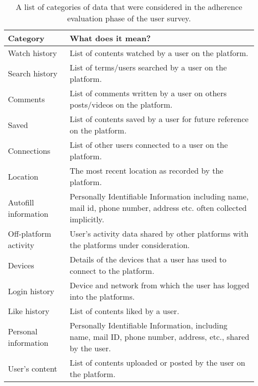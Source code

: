 \begin{table*}[t]
\small
\begin{tabular}{@{}ll@{}}
\toprule
\textbf{Category}     & \textbf{What does it mean?}                                                                                            \\ \midrule
Watch history         & List of contents watched by a user on the platform.                                                                    \\
Search history        & List of terms/users searched by a user on the platform.                                                                \\
Comments              & List of comments written by a user on others posts/videos on the platform.                                             \\
Saved                 & List of contents saved by a user for future reference on the platform.                                                 \\
Connections           & List of other users connected to a user on the platform.                                                               \\
Location              & The most recent location as recorded by the platform.                                             \\
Autofill information  & Personally Identifiable Information including name, mail id, phone number, address etc. often collected implicitly.    \\
Off-platform activity & User's activity data shared by other platforms with the platforms under consideration.                                 \\
Devices               & Details of the devices that a user has used to connect to the platform.                                                \\
Login history         & Device and network from which the user has logged into the platforms.                                                  \\
Like history          & List of contents liked by a user.                                                                                      \\
Personal information  & Personally Identifiable Information, including name, mail ID, phone number, address, etc., shared by the user. \\
User's content        & List of contents uploaded or posted by the user on the platform.                                                       \\ \bottomrule
\end{tabular}
\caption{A list of categories of data that were considered in the adherence evaluation phase of the user survey.}
\label{Tab: FieldsEval}
\end{table*}

